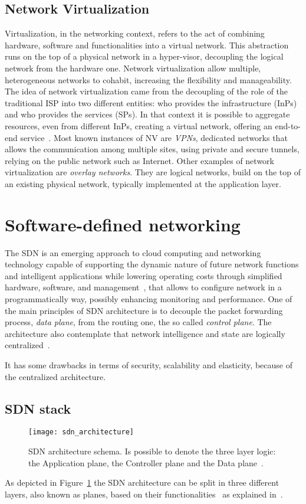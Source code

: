 \subsection{Network Virtualization}
Virtualization, in the networking context, refers to the act of combining
hardware, software and functionalities into a virtual network. This abstraction
runs on the top of a physical network in a hyper-visor, decoupling the logical
network from the hardware one. Network virtualization allow multiple,
heterogeneous networks to cohabit, increasing the flexibility and manageability.
The idea of network virtualization came from the decoupling of the role of the
traditional ISP into two different entities: who provides the infrastructure
(InPs) and who provides the services (SPs). In that context it is possible to
aggregate resources, even from different InPs, creating a virtual network,
offering an end-to-end service~\cite{chowdhury2009network}. Most known instances
of NV are \emph{VPNs}, dedicated networks that allows the communication among
multiple sites, using private and secure tunnels, relying on the public network
such as Internet. Other examples of network virtualization are \emph{overlay
  networks}. They are logical networks, build on the top of an existing physical
network, typically implemented at the application layer.

\section{Software-defined networking}
The SDN is an emerging approach to cloud computing and networking technology
capable of supporting the dynamic nature of future network functions and
intelligent applications while lowering operating costs through simplified
hardware, software, and management~\cite{sezer2013we}, that allows to configure
network in a programmatically way, possibly enhancing monitoring and
performance. One of the main principles of SDN architecture is to decouple the
packet forwarding process, \emph{data plane}, from the routing one, the so
called \emph{control plane}. The architecture also contemplate that network
intelligence and state are logically centralized~\cite{fundation2012software}. 

It has some drawbacks in terms of security, scalability and elasticity, because
of the centralized architecture.

\subsection{SDN stack}
\begin{figure}[ht]
 \centering
 \texttt{[image: sdn\_architecture]}
 \caption[SDN architecture schema]{SDN architecture schema. Is possible to 
denote the three layer logic: the Application plane, the Controller plane and 
the Data plane~\cite{fundation2013software}.}
 \label{chap:background:img:sdn_architecture}
\end{figure}
As depicted in Figure~\ref{chap:background:img:sdn_architecture} the SDN
architecture can be split in three different layers, also known as planes,
based on their functionalities~\cite{fundation2012software} as explained
in~\cite{fundation2013software}.

